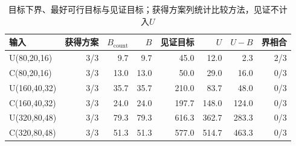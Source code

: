 \begin{table}[htbp]
\centering\footnotesize
\caption{目标下界、最好可行目标与见证目标；获得方案列统计比较方法，见证不计入$U$}\label{tab:bounds}
\begin{tabular}{lrrrrrrr}\toprule
输入 & 获得方案 & $B_{\mathrm{count}}$ & $B$ & 见证目标 & $U$ & $U-B$ & 界相合 \\\midrule
U(80,20,16) & 3/3 & 9.7 & 9.7 & 45.0 & 12.0 & 2.3 & 2/3 \\
C(80,20,16) & 3/3 & 13.0 & 13.0 & 50.0 & 29.0 & 16.0 & 0/3 \\
U(160,40,32) & 3/3 & 35.7 & 35.7 & 210.0 & 83.7 & 48.0 & 0/3 \\
C(160,40,32) & 3/3 & 24.0 & 24.0 & 197.7 & 148.0 & 124.0 & 0/3 \\
U(320,80,48) & 3/3 & 79.3 & 79.3 & 616.3 & 362.7 & 283.3 & 0/3 \\
C(320,80,48) & 3/3 & 51.3 & 51.3 & 577.0 & 514.7 & 463.3 & 0/3 \\
\bottomrule\end{tabular}
\end{table}
